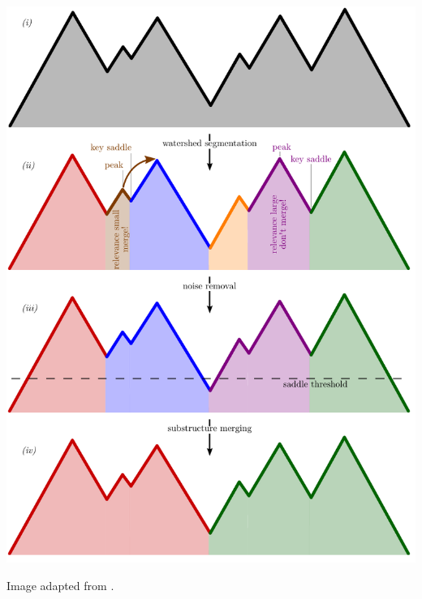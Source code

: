 %
%		
%		
%		


\begin{frame}
	\centering
	\includegraphics[height=.95\textheight]{../report/images/phew/soap.pdf}
	
	{\tiny Image adapted from \cite{PHEW}.}
\end{frame}